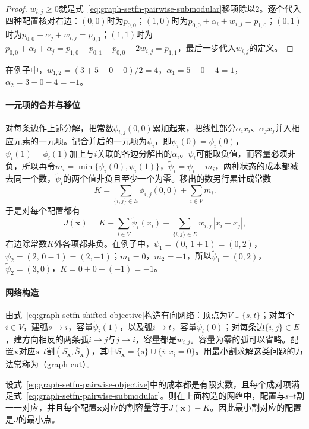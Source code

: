 \begin{proof}
$w_{i,j}\geq0$就是式~\eqref{eq:graph-setfn-pairwise-submodular}移项除以$2$。逐个代入四种配置核对右边：$(0,0)$时为$p_{0,0}$；$(1,0)$时为$p_{0,0}+\alpha_i+w_{i,j}=p_{1,0}$；$(0,1)$时为$p_{0,0}+\alpha_j+w_{i,j}=p_{0,1}$；$(1,1)$时为$p_{0,0}+\alpha_i+\alpha_j=p_{1,0}+p_{0,1}-p_{0,0}-2w_{i,j}=p_{1,1}$，最后一步代入$w_{i,j}$的定义。
\end{proof}

在例子中，$w_{1,2}=(3+5-0-0)/2=4$，$\alpha_1=5-0-4=1$，$\alpha_2=3-0-4=-1$。

\paragraph{一元项的合并与移位}
对每条边作上述分解，把常数$\phi_{i,j}(0,0)$累加起来，把线性部分$\alpha_ix_i$、$\alpha_jx_j$并入相应元素的一元项。记合并后的一元项为$\psi_i$，即$\psi_i(0)=\phi_i(0)$，$\psi_i(1)=\phi_i(1)$加上与$i$关联的各边分解出的$\alpha_i$。$\psi_i$可能取负值，而容量必须非负，所以再令$m_i=\min\{\psi_i(0),\psi_i(1)\}$，$\tilde\psi_i=\psi_i-m_i$，两种状态的成本都减去同一个数，$\tilde\psi_i$的两个值非负且至少一个为零。移出的数另行累计成常数
\[
  K=\sum_{\{i,j\}\in E}\phi_{i,j}(0,0)+\sum_{i\in V}m_i .
\]
于是对每个配置都有
\begin{equation}
  J(\bm x)=K+\sum_{i\in V}\tilde\psi_i(x_i)+\sum_{\{i,j\}\in E}w_{i,j}\,|x_i-x_j|,
  \label{eq:graph-setfn-shifted-objective}
\end{equation}
右边除常数$K$外各项都非负。在例子中，$\psi_1=(0,\,1+1)=(0,2)$，$\psi_2=(2,\,0-1)=(2,-1)$；$m_1=0$，$m_2=-1$，所以$\tilde\psi_1=(0,2)$，$\tilde\psi_2=(3,0)$，$K=0+0+(-1)=-1$。

\paragraph{网络构造}
由式~\eqref{eq:graph-setfn-shifted-objective}构造有向网络：顶点为$V\cup\{s,t\}$；对每个$i\in V$，建弧$s\to i$，容量$\tilde\psi_i(1)$，以及弧$i\to t$，容量$\tilde\psi_i(0)$；对每条边$\{i,j\}\in E$，建方向相反的两条弧$i\to j$与$j\to i$，容量都是$w_{i,j}$。容量为零的弧可以省略。配置$\bm x$对应$s$--$t$割$(S_{\bm x},\bar S_{\bm x})$，其中$S_{\bm x}=\{s\}\cup\{i:x_i=0\}$。用最小割求解这类问题的方法常称为（graph cut）。

\begin{theorem}[成对二值函数的割表示]
\label{thm:graph-setfn-cut-representation}
设式~\eqref{eq:graph-setfn-pairwise-objective}中的成本都是有限实数，且每个成对项满足式~\eqref{eq:graph-setfn-pairwise-submodular}。则在上面构造的网络中，配置与$s$--$t$割一一对应，并且每个配置$\bm x$对应的割容量等于$J(\bm x)-K$。因此最小割对应的配置是$J$的最小点。
\end{theorem}

